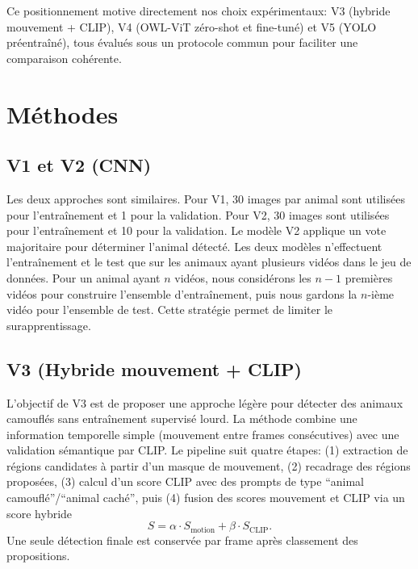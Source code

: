 \documentclass{article}
\begin{document}
Ce positionnement motive directement nos choix expérimentaux: V3 (hybride mouvement + CLIP), V4 (OWL-ViT zéro-shot et fine-tuné) et V5 (YOLO préentraîné), tous évalués sous un protocole commun pour faciliter une comparaison cohérente.

\section{Méthodes}
\subsection{V1 et V2 (CNN)}
Les deux approches sont similaires. Pour V1, 30 images par animal sont utilisées pour l’entraînement et 1 pour la validation. Pour V2, 30 images sont utilisées pour l’entraînement et 10 pour la validation. Le modèle V2 applique un vote majoritaire pour déterminer l’animal détecté. Les deux modèles n’effectuent l’entraînement et le test que sur les animaux ayant plusieurs vidéos dans le jeu de données. Pour un animal ayant \(n\) vidéos, nous considérons les \(n-1\) premières vidéos pour construire l’ensemble d’entraînement, puis nous gardons la \(n\)-ième vidéo pour l’ensemble de test. Cette stratégie permet de limiter le surapprentissage.


\subsection{V3 (Hybride mouvement + CLIP)}
L’objectif de V3 est de proposer une approche légère pour détecter des animaux camouflés sans entraînement supervisé lourd. La méthode combine une information temporelle simple (mouvement entre frames consécutives) avec une validation sémantique par CLIP. Le pipeline suit quatre étapes: (1) extraction de régions candidates à partir d’un masque de mouvement, (2) recadrage des régions proposées, (3) calcul d’un score CLIP avec des prompts de type ``animal camouflé''/``animal caché'', puis (4) fusion des scores mouvement et CLIP via un score hybride
\[
S = \alpha \cdot S_{\text{motion}} + \beta \cdot S_{\text{CLIP}}.
\]
Une seule détection finale est conservée par frame après classement des propositions.
\end{document}
